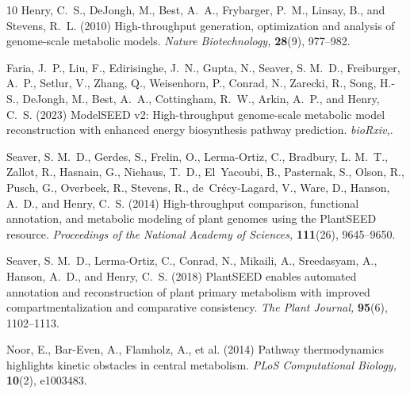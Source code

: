 \documentclass[unnumsec,webpdf,modern,large]{oup-authoring-template}
\begin{document}
\begin{thebibliography}{10}
Henry, C.~S., DeJongh, M., Best, A.~A., Frybarger, P.~M., Linsay, B., and
  Stevens, R.~L. (2010)
High-throughput generation, optimization and analysis of genome-scale metabolic
  models.
{\em Nature Biotechnology,} {\bf 28}(9), 977--982.

Faria, J.~P., Liu, F., Edirisinghe, J.~N., Gupta, N., Seaver, S. M.~D.,
  Freiburger, A.~P., Setlur, V., Zhang, Q., Weisenhorn, P., Conrad, N.,
  Zarecki, R., Song, H.-S., DeJongh, M., Best, A.~A., Cottingham, R.~W., Arkin,
  A.~P., and Henry, C.~S. (2023)
{ModelSEED} v2: High-throughput genome-scale metabolic model reconstruction
  with enhanced energy biosynthesis pathway prediction.
{\em bioRxiv,}.

Seaver, S. M.~D., Gerdes, S., Frelin, O., Lerma-Ortiz, C., Bradbury, L. M.~T.,
  Zallot, R., Hasnain, G., Niehaus, T.~D., El~Yacoubi, B., Pasternak, S.,
  Olson, R., Pusch, G., Overbeek, R., Stevens, R., de~Cr\'ecy-Lagard, V., Ware,
  D., Hanson, A.~D., and Henry, C.~S. (2014)
High-throughput comparison, functional annotation, and metabolic modeling of
  plant genomes using the {PlantSEED} resource.
{\em Proceedings of the National Academy of Sciences,} {\bf 111}(26),
  9645--9650.

Seaver, S. M.~D., Lerma-Ortiz, C., Conrad, N., Mikaili, A., Sreedasyam, A.,
  Hanson, A.~D., and Henry, C.~S. (2018)
{PlantSEED} enables automated annotation and reconstruction of plant primary
  metabolism with improved compartmentalization and comparative consistency.
{\em The Plant Journal,} {\bf 95}(6), 1102--1113.

Noor, E., Bar-Even, A., Flamholz, A., et al. (2014)
Pathway thermodynamics highlights kinetic obstacles in central metabolism.
{\em PLoS Computational Biology,} {\bf 10}(2), e1003483.

\end{thebibliography}
\end{document}
